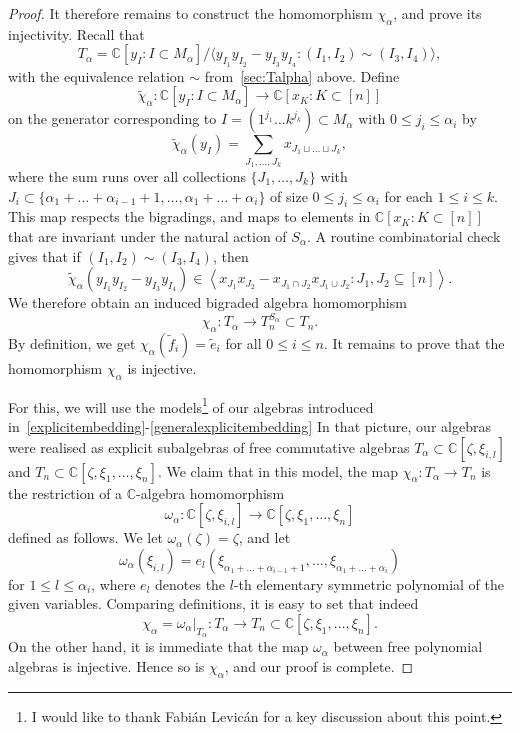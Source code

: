 \documentclass[a4paper,11pt]{amsart}
\theoremstyle{plain}
\theoremstyle{definition}
\newcommand{\C}{\mathbb{C}}
\newcommand{\pa}{T} %
\newcommand{\te}{\widetilde{e}}
\newcommand{\tf}{\widetilde{f}}
\begin{document}
\begin{proof}
It therefore remains to construct the homomorphism $\chi_\alpha$, and prove its injectivity.
Recall that 
\[\pa_\alpha  = \C\left[y_{\scriptscriptstyle I} \colon I\subset M_\alpha\right]/\langle y_{\scriptscriptstyle I_1} y_{\scriptscriptstyle I_2} - y_{\scriptscriptstyle I_3} y_{\scriptscriptstyle I_4}\colon (I_1,I_2)\sim (I_3,I_4)\rangle,\]
with the equivalence relation $\sim$ from~\ref{sec:Talpha} above. 
Define
\[\tilde\chi_\alpha \colon \C\left[y_{\scriptscriptstyle I} \colon I\subset M_\alpha\right] \to \C\left[x_K \colon K\subset [n]\right] 
\]
on the generator corresponding to $I=(1^{j_1}\ldots k^{j_k})\subset M_\alpha \mbox{ with } 0\leq j_i\leq \alpha_i$ by 
\[
\tilde\chi_\alpha(y_{\scriptscriptstyle I}) = \sum_{J_1, \ldots, J_k} x_{J_1\sqcup \ldots \sqcup J_k}, 
\]
where the sum runs over all collections $\{{J_1, \ldots, J_k}\}$ with $J_i\subset\{\alpha_1+\ldots +\alpha_{i-1}+1, \ldots, \alpha_1+\ldots +\alpha_i\}$ of size $0\leq j_i\leq \alpha_i$ for each $1\leq i \leq k$. This map respects the bigradings, and maps to elements in $\C\left[x_K \colon K\subset [n]\right]$ that are invariant under the natural action of $S_\alpha$. A routine combinatorial check gives that if $(I_1,I_2)\sim (I_3,I_4)$, then 
\[
\tilde\chi_\alpha(y_{I_1} y_{I_2} - y_{I_3} y_{I_4}) \in \left\langle x_{J_1}x_{J_2}-x_{J_1\cap J_2}x_{J_1\cup J_2}\colon J_1,J_2\subseteq[n]\right\rangle. 
\]
We therefore obtain an induced bigraded algebra homomorphism 
\[ \chi_\alpha \colon T_\alpha\to T_n^{S_\alpha}\subset T_n.\]
By definition, we get $\chi_\alpha(\tf_i)=\te_i$ for all $0\leq i\leq n$.
It remains to prove that the homomorphism $\chi_\alpha$ is injective. 

For this, we will use the models\footnote{I would like to thank Fabi\'an Levi\-c\'an for a key discussion about this point.} of our algebras introduced in~\eqref{explicitembedding}-\eqref{generalexplicitembedding}  In that picture, our algebras were realised as explicit subalgebras of free
commutative algebras  $T_\alpha \subset \C[\zeta, \xi_{i,l}]$ and $T_n\subset \C[\zeta,\xi_1, \ldots, \xi_n]$. 
We claim that in this model, the map $\chi_\alpha \colon T_\alpha\to T_n$ is the restriction of a $\C$-algebra
homomorphism
\[  \omega_\alpha\colon\C[\zeta, \xi_{i,l}]\to \C[\zeta,\xi_1, \ldots, \xi_n]\]
defined as follows. We let $\omega_\alpha(\zeta) = \zeta$, and let
\[\omega_\alpha(\xi_{i,l}) = e_l(\xi_{\alpha_1+\ldots +\alpha_{i-1}+1}, \ldots, \xi_{\alpha_1+\ldots +\alpha_i})
\]
for $1\leq l \leq \alpha_i$, where $e_l$ denotes the $l$-th elementary symmetric polynomial of the given variables. 
Comparing definitions, it is easy to set that indeed \[\chi_\alpha = \omega_\alpha|_{T_\alpha}\colon T_\alpha\to T_n\subset \C[\zeta,\xi_1, \ldots, \xi_n].\]
On the other hand, it is immediate that the map $\omega_\alpha$ between free polynomial algebras is injective. 
Hence so is $\chi_\alpha$, and our proof is complete. 
\end{proof}
\end{document}
